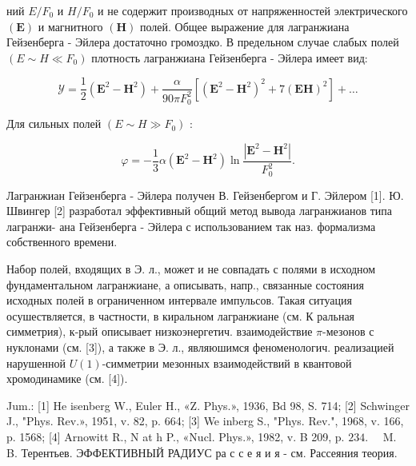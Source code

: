 \documentclass[10pt]{article}
\begin{document}
ний $E / F_{0}$ и $H / F_{0}$ и не содержит производных от напряженностей электрического $(\boldsymbol{E})$ и магнитного $(\boldsymbol{H})$ полей. Общее выражение для лагранжиана Гейзенберга - Эйлера достаточно громоздко. В предельном случае слабых полей $\left(E \sim H \ll F_{0}\right)$ плотность лагранжиана Гейзенберга - Эйлера имеет вид:



\[

\mathscr{Y}=\frac{1}{2}\left(\boldsymbol{E}^{2}-\boldsymbol{H}^{2}\right)+\frac{\alpha}{90 \pi F_{0}^{2}}\left[\left(\boldsymbol{E}^{2}-\boldsymbol{H}^{2}\right)^{2}+7(\boldsymbol{E} \boldsymbol{H})^{2}\right]+\ldots

\]



Для сильных полей $\left(E \sim H \gg F_{0}\right)$ :



\[

\mathscr{\varphi}=-\frac{1}{3} \alpha\left(\boldsymbol{E}^{2}-\boldsymbol{H}^{2}\right) \ln \frac{\left|\boldsymbol{E}^{2}-\boldsymbol{H}^{2}\right|}{F_{0}^{2}} .

\]



Лагранжиан Гейзенберга - Эйлера получен В. Гейзенбергом и Г. Эйлером [1]. Ю. Швингер [2] разработал эффективный общий метод вывода лагранжианов типа лагранжи- ана Гейзенберга - Эйлера с использованием так наз. формализма собственного времени.



Набор полей, входящих в Э. л., может и не совпадать с полями в исходном фундаментальном лагранжиане, а описывать, напр., связанные состояния исходных полей в ограниченном интервале импульсов. Такая ситуация осушествляется, в частности, в киральном лагранжиане (см. К ральная симметрия), к-рый описывает низкоэнергетич. взаимодействие $\pi$-мезонов с нуклонами (см. [3]), а также в Э. л., являюшимся феноменологич. реализацией нарушенной $U(1)$-симметрии мезонных взаимодействий в квантовой хромодинамике (см. [4]).



Jum.: [1] He isenberg W., Euler H., «Z. Phys.», 1936, Bd 98, S. 714; [2] Schwinger J., "Phys. Rev.», 1951, v. 82, p. 664; [3] We inberg S., "Phys. Rev.", 1968, v. 166, p. 1568; [4] Arnowitt R., $\mathrm{N}$ at h P., «Nucl. Phys.», 1982, v. B 209, p. $234 . \quad$ M. B. Терентьев. ЭФФЕКТИВНЫЙ РАДИУС ра с с е я и я - см. Рассеяния теория.
\end{document}
